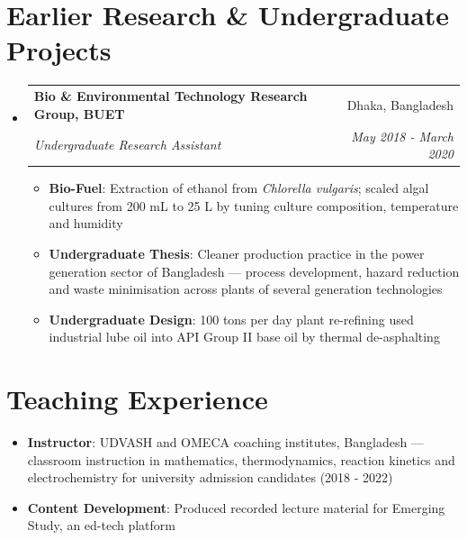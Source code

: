 \documentclass[letterpaper,20pt]{article}
\makeatletter
\newcommand{\resumeItem}[2]{
  \item\small{
    \textbf{#1}{: #2 \vspace{-2pt}}
  }
}
\newcommand{\resumeSubheading}[4]{
  \vspace{-1pt}\item
    \begin{tabular*}{0.97\textwidth}{l@{\extracolsep{\fill}}r}
      \textbf{#1} & #2 \\
      \textit{\small#3} & \textit{\small #4} \\
    \end{tabular*}\vspace{-7pt}
}
\newcommand{\resumeSubHeadingListStart}{\begin{itemize}[leftmargin=*]}
\newcommand{\resumeSubHeadingListEnd}{\end{itemize}}
\newcommand{\resumeItemListStart}{\begin{itemize}}
\newcommand{\resumeItemListEnd}{\end{itemize}\vspace{-5pt}}
\makeatother
\begin{document}
\section{Earlier Research \& Undergraduate Projects}
  \resumeSubHeadingListStart
    \resumeSubheading
      {Bio \& Environmental Technology Research Group, BUET}{Dhaka, Bangladesh}
      {Undergraduate Research Assistant}{May 2018 - March 2020}
      \resumeItemListStart
        \resumeItem{Bio-Fuel}{Extraction of ethanol from \textit{Chlorella vulgaris}; scaled algal cultures from 200 mL to 25 L by tuning culture composition, temperature and humidity}
      \resumeItemListEnd
    \resumeItemListStart
      \resumeItem{Undergraduate Thesis}{Cleaner production practice in the power generation sector of Bangladesh --- process development, hazard reduction and waste minimisation across plants of several generation technologies}
      \resumeItem{Undergraduate Design}{100 tons per day plant re-refining used industrial lube oil into API Group II base oil by thermal de-asphalting}
    \resumeItemListEnd
  \resumeSubHeadingListEnd
\vspace{-6pt}

\section{Teaching Experience}
  \resumeSubHeadingListStart
    \resumeItemListStart
      \resumeItem{Instructor}{UDVASH and OMECA coaching institutes, Bangladesh --- classroom instruction in mathematics, thermodynamics, reaction kinetics and electrochemistry for university admission candidates (2018 - 2022)}
      \resumeItem{Content Development}{Produced recorded lecture material for Emerging Study, an ed-tech platform}
    \resumeItemListEnd
  \resumeSubHeadingListEnd
\end{document}
